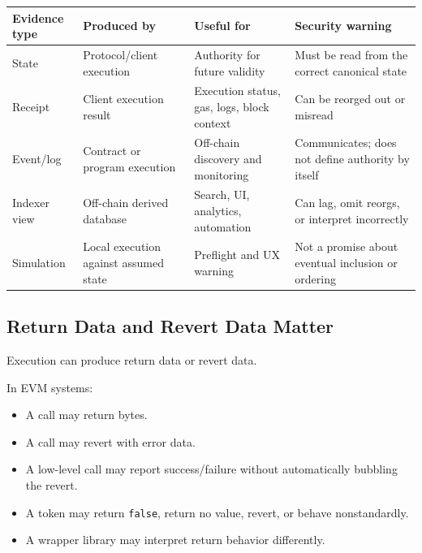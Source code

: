 {\def\LTcaptype{none} %
\begin{longtable}[]{@{}
  >{\raggedright\arraybackslash}p{}
  >{\raggedright\arraybackslash}p{}
  >{\raggedright\arraybackslash}p{}
  >{\raggedright\arraybackslash}p{}@{}}
\toprule\noalign{}
\begin{minipage}[b]{\linewidth}\raggedright
Evidence type
\end{minipage} & \begin{minipage}[b]{\linewidth}\raggedright
Produced by
\end{minipage} & \begin{minipage}[b]{\linewidth}\raggedright
Useful for
\end{minipage} & \begin{minipage}[b]{\linewidth}\raggedright
Security warning
\end{minipage} \\
\midrule\noalign{}
\endhead
\bottomrule\noalign{}
\endlastfoot
State & Protocol/client execution & Authority for future validity & Must
be read from the correct canonical state \\
Receipt & Client execution result & Execution status, gas, logs, block
context & Can be reorged out or misread \\
Event/log & Contract or program execution & Off-chain discovery and
monitoring & Communicates; does not define authority by itself \\
Indexer view & Off-chain derived database & Search, UI, analytics,
automation & Can lag, omit reorgs, or interpret incorrectly \\
Simulation & Local execution against assumed state & Preflight and UX
warning & Not a promise about eventual inclusion or ordering \\
\end{longtable}
}

\subsection{Return Data and Revert Data Matter}

Execution can produce return data or revert data.

In EVM systems:

\begin{itemize}
\tightlist
\item
  A call may return bytes.
\item
  A call may revert with error data.
\item
  A low-level call may report success/failure without automatically
  bubbling the revert.
\item
  A token may return \passthrough{\lstinline!false!}, return no value,
  revert, or behave nonstandardly.
\item
  A wrapper library may interpret return behavior differently.
\end{itemize}

